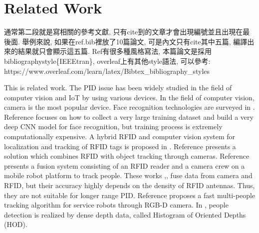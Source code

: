 \chapter{Related Work}
\label{ch:relatedwork}
通常第二段就是寫相關的參考文獻, 只有cite到的文章才會出現編號並且出現在最後面. 舉例來說, 如果在ref.bib裡放了10篇論文, 可是內文只有cite其中五篇, 編譯出來的結果就只會顯示這五篇. Ref有很多種風格寫法, 本篇論文是採用bibliographystyle\{IEEEtran\}, 
overleaf上有其他style語法, 可以參考: \\
https://www.overleaf.com/learn/latex/Bibtex\_bibliography\_styles

This is related work. The PID issue has been widely studied in the field of computer vision and IoT by using various devices. In the field of computer vision, camera is the most popular device. Face recognition technologies are surveyed in \cite{zhao2003face}. Reference \cite{parkhi2015deep} focuses on how to collect a very large training dataset and build a very deep CNN model for face recognition, but training process is extremely computationally expensive. A hybrid RFID and computer vision system for localization and tracking of RFID tags is proposed in \cite{goller2014fusing}. Reference \cite{isasi2010location} presents a solution which combines RFID with object tracking through cameras. Reference \cite{germa2010vision} presents a fusion system consisting of an RFID reader and a camera crew on a mobile robot platform to track people. These works \cite{goller2014fusing},\cite{isasi2010location},\cite{germa2010vision} fuse data from camera and RFID, but their accuracy highly depends on the density of RFID antennas. Thus, they are not suitable for longer range PID. Reference \cite{munaro2014fast} proposes a fast multi-people tracking algorithm for service robots through RGB-D camera. In \cite{spinello2011people}, people detection is realized by dense depth data, called Histogram of Oriented Depths (HOD). 